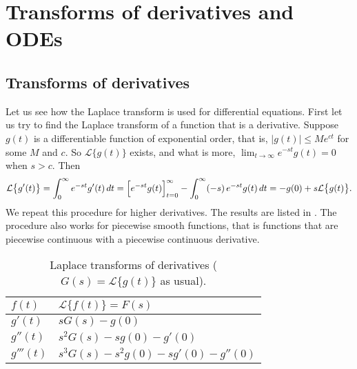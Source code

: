 
\sectionnewpage
\section{Transforms of derivatives and ODEs}
\label{transformsofders:section}


\subsection{Transforms of derivatives}

Let us see how the Laplace transform is used for differential equations.
First let us try to find the Laplace transform of a function that is a
derivative.  Suppose $g(t)$ is a differentiable function
of exponential order, that is, $\lvert g(t) \rvert \leq M e^{ct}$ for some
$M$ and $c$.  So $\mathcal{L} \bigl\{ g(t) \bigr\}$ exists, and what is more,
$\lim_{t\to\infty} e^{-st}g(t) = 0$ when $s > c$.  Then
\begin{equation*}
\mathcal{L} \bigl\{ g'(t) \bigr\}
=
\int_0^\infty
e^{-st}
g'(t) \,dt
=
\Bigl[e^{-st} g(t) \Bigr]_{t=0}^\infty
-
\int_0^\infty
(-s)\,
e^{-st}
g(t) \,dt
=
-g(0) + s \mathcal{L} \bigl\{ g(t) \bigr\} .
\end{equation*}
We repeat this procedure for higher derivatives.
The results are
listed in .  The procedure also works for piecewise
smooth functions, that is functions that are piecewise continuous with a
piecewise continuous derivative.

\begin{table}[h!t]
\mybeginframe
\capstart
\begin{center}
\begin{tabular}{@{}ll@{}}
\toprule
$f(t)$ & $\mathcal{L} \bigl\{ f(t) \bigr\} = F(s)$ \\
\midrule
$g'(t)$ & $sG(s)-g(0)$ \\[4pt]
$g''(t)$ & $s^2G(s)-sg(0)-g'(0)$ \\[4pt]
$g'''(t)$ & $s^3G(s)-s^2g(0)-sg'(0)-g''(0)$ \\[4pt]
\bottomrule
\end{tabular}
\end{center}
\caption{Laplace transforms of derivatives
($G(s) = \mathcal{L} \bigl\{ g(t) \bigr\}$
as usual).\label{ltd:table}}
\myendframe
\end{table}

